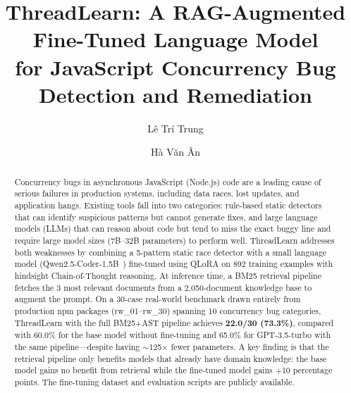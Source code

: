 \documentclass[runningheads]{llncs}
\begin{document}
\title{ThreadLearn: A RAG-Augmented Fine-Tuned Language Model\\
       for JavaScript Concurrency Bug Detection and Remediation}


\author{Lê Trí Trung \and
        Hà Văn Ân}



\maketitle

\begin{abstract}
Concurrency bugs in asynchronous JavaScript (Node.js) code are a leading
cause of serious failures in production systems, including data races,
lost updates, and application hangs.
Existing tools fall into two categories: rule-based static detectors that
can identify suspicious patterns but cannot generate fixes, and large
language models (LLMs) that can reason about code but tend to miss the
exact buggy line and require large model sizes (7B--32B parameters) to
perform well.
ThreadLearn addresses both weaknesses by combining a 5-pattern static
race detector with a small language model (Qwen2.5-Coder-1.5B~\cite{qwen25coder}) fine-tuned
using QLoRA on 892 training examples with hindsight Chain-of-Thought
reasoning.
At inference time, a BM25 retrieval pipeline fetches the 3 most relevant
documents from a 2,050-document knowledge base to augment the prompt.
On a 30-case real-world benchmark drawn entirely from production npm packages
(rw\_01--rw\_30) spanning 10 concurrency bug categories, ThreadLearn with
the full BM25+AST pipeline achieves \textbf{22.0/30 (73.3\%)},
compared with 60.0\% for the base model without fine-tuning and 65.0\% for
GPT-3.5-turbo with the same pipeline---despite having $\sim$125$\times$
fewer parameters.
A key finding is that the retrieval pipeline only benefits models that
already have domain knowledge: the base model gains no benefit from retrieval
while the fine-tuned model gains $+$10 percentage points.
The fine-tuning dataset and evaluation scripts are publicly available.

\end{abstract}
\end{document}
